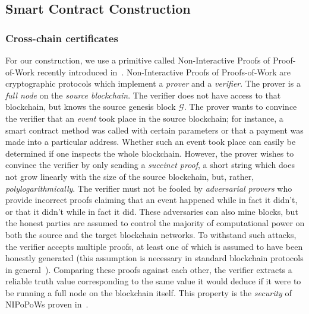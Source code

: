 \subsection{Smart Contract Construction}


\subsubsection{Cross-chain certificates}
For our construction, we use a primitive called Non-Interactive Proofs of
Proof-of-Work recently introduced in~\cite{nipopows}.
Non-Interactive Proofs of Proofs-of-Work are cryptographic protocols which
implement a \emph{prover} and a \emph{verifier}. The prover is a \emph{full
node} on the \emph{source blockchain}. The verifier does not have access to
that blockchain, but knows the source genesis block $\mathcal{G}$. The prover
wants to convince the verifier that an \emph{event} took place in the source
blockchain; for instance, a smart contract method was called with certain
parameters or that a payment was made into a particular address. Whether such an
event took place can easily be determined if one inspects the whole blockchain.
However, the prover wishes to convince the verifier by only sending a
\emph{succinct proof}, a short string which does not grow linearly  with the
size of the source blockchain, but, rather, \emph{polylogarithmically}. The
verifier must not be fooled by \emph{adversarial provers} who provide incorrect
proofs claiming that an event happened while in fact it didn't, or that it
didn't while in fact it did. These adversaries can also mine blocks, but the
honest parties are assumed to control the majority of computational power on
both the source and the target blockchain networks. To withstand such attacks,
the verifier accepts multiple proofs, at least one of which is assumed to have
been honestly generated (this assumption is necessary in standard blockchain
protocols in general~\cite{eclipse,eclipse-ethereum}). Comparing these
proofs against each other, the verifier extracts a reliable truth value
corresponding to the same value it would deduce if it were to be running a full
node on the blockchain itself. This property is the \emph{security} of NIPoPoWs
proven in~\cite{nipopows}.

